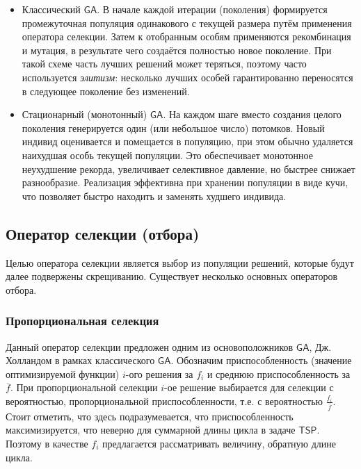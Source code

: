 \documentclass[a4paper,12pt]{article}
\begin{document}
\begin{itemize}
    \item Классический $\mathsf{GA}$. В начале каждой итерации (поколения) формируется промежуточная популяция одинакового с текущей размера путём применения оператора селекции. Затем к отобранным особям применяются рекомбинация и мутация, в результате чего создаётся полностью новое поколение. При такой схеме часть лучших решений может теряться, поэтому часто используется \textit{элитизм}: несколько лучших особей гарантированно переносятся в следующее поколение без изменений.

    \item Стационарный (монотонный) $\mathsf{GA}$. На каждом шаге вместо создания целого поколения генерируется один (или небольшое число) потомков. Новый индивид оценивается и помещается в популяцию, при этом обычно удаляется наихудшая особь текущей популяции. Это обеспечивает монотонное неухудшение рекорда, увеличивает селективное давление, но быстрее снижает разнообразие. Реализация эффективна при хранении популяции в виде кучи, что позволяет быстро находить и заменять худшего индивида.
\end{itemize}


    

\subsection{Оператор селекции (отбора)}

Целью оператора селекции является выбор из популяции решений, которые будут далее подвержены скрещиванию. Существует несколько основных операторов отбора. 

\subsubsection{Пропорциональная селекция}

Данный оператор селекции предложен одним из основоположников $\mathsf{GA}$, Дж. Холландом в рамках классического $\mathsf{GA}$. Обозначим приспособленность (значение оптимизируемой функции) $i$-ого решения за $f_i$ и среднюю приспособленность за $\overline f$. При пропорциональной селекции $i$-ое решение выбирается для селекции с вероятностью, пропорциональной приспособленности, т.е. с вероятностью $\frac{f_i}{\overline{f}}$. Стоит отметить, что здесь подразумевается, что приспособленность максимизируется, что неверно для суммарной длины цикла в задаче $\mathsf{TSP}$. Поэтому в качестве $f_i$ предлагается рассматривать величину, обратную длине цикла. 
\end{document}
